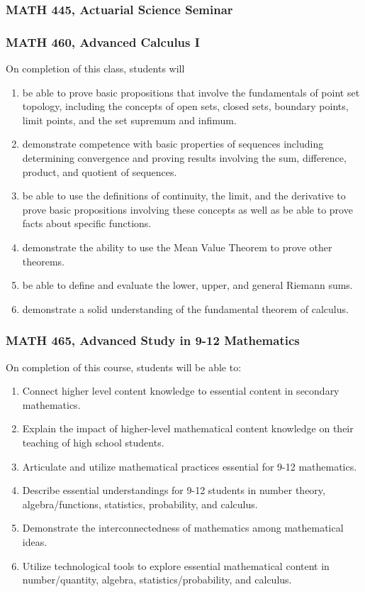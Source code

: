 \documentclass[11pt]{article}
\newenvironment{alphalist}{
  \begin{enumerate}[(1)]
    \addtolength{\itemsep}{-1.0\itemsep}}
  {\end{enumerate}}
\begin{document}
\subsubsection*{MATH 445, Actuarial Science Seminar}


\subsubsection*{MATH 460, Advanced Calculus I}

On completion of this class, students will
\begin{alphalist}
    \item be able to prove basic propositions that involve the fundamentals of point set topology, including the concepts of open sets, closed sets, boundary points, limit points, and the set supremum and infimum. 
    \item demonstrate competence with basic properties of sequences including determining convergence and proving results involving the sum, difference, product, and quotient of sequences.
    \item be able to use the definitions of continuity, the limit, and the derivative to prove basic propositions involving these concepts as well as be able to prove facts about specific functions.
    \item demonstrate the ability to use the Mean Value Theorem to prove other theorems. 
    \item be able to define and evaluate the lower, upper, and general Riemann sums.
    \item demonstrate a solid understanding of the fundamental theorem of calculus.
\end{alphalist}

\subsubsection*{MATH 465, Advanced Study in 9-12 Mathematics}

On  completion of this course, students will be able to:
\begin{alphalist}

\item Connect higher level content knowledge to essential content in secondary mathematics.
\item Explain the impact of higher-level mathematical content knowledge on their teaching of high school students.
\item Articulate and utilize mathematical practices essential for 9-12 mathematics.
\item Describe essential understandings for 9-12 students in number theory, algebra/functions, statistics, probability, and calculus.
\item Demonstrate the interconnectedness of mathematics among mathematical ideas.
\item Utilize technological tools to explore essential mathematical content in number/quantity, algebra, statistics/probability, and calculus.
\end{alphalist}
\end{document}
